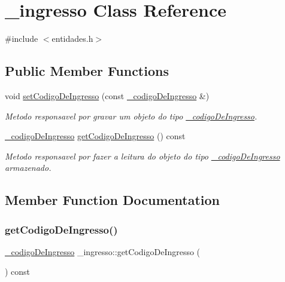 \hypertarget{class__ingresso}{}\section{\+\_\+ingresso Class Reference}
\label{class__ingresso}


{\ttfamily \#include $<$entidades.\+h$>$}

\subsection*{Public Member Functions}
\begin{DoxyCompactItemize}
\item 
void \mbox{\hyperlink{class__ingresso_ae45bd0d8129853559d23afad5ff52572}{set\+Codigo\+De\+Ingresso}} (const \mbox{\hyperlink{class__codigo_de_ingresso}{\+\_\+codigo\+De\+Ingresso}} \&)
\begin{DoxyCompactList}\small\item\em Metodo responsavel por gravar um objeto do tipo \mbox{\hyperlink{class__codigo_de_ingresso}{\+\_\+codigo\+De\+Ingresso}}. \end{DoxyCompactList}\item 
\mbox{\hyperlink{class__codigo_de_ingresso}{\+\_\+codigo\+De\+Ingresso}} \mbox{\hyperlink{class__ingresso_af68a23f8d0056fa417c83faa729a4cf0}{get\+Codigo\+De\+Ingresso}} () const
\begin{DoxyCompactList}\small\item\em Metodo responsavel por fazer a leitura do objeto do tipo \mbox{\hyperlink{class__codigo_de_ingresso}{\+\_\+codigo\+De\+Ingresso}} armazenado. \end{DoxyCompactList}\end{DoxyCompactItemize}


\subsection{Member Function Documentation}
\mbox{\label{class__ingresso_af68a23f8d0056fa417c83faa729a4cf0}} 
\subsubsection{\texorpdfstring{getCodigoDeIngresso()}{getCodigoDeIngresso()}}
{\footnotesize\ttfamily \mbox{\hyperlink{class__codigo_de_ingresso}{\+\_\+codigo\+De\+Ingresso}} \+\_\+ingresso\+::get\+Codigo\+De\+Ingresso (\begin{DoxyParamCaption}{ }\end{DoxyParamCaption}) const}




